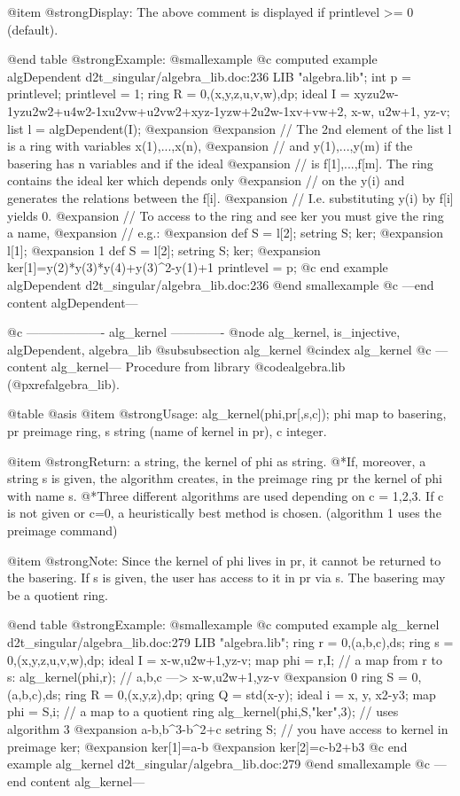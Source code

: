 @item @strong{Display:}
The above comment is displayed if printlevel >= 0 (default).

@end table
@strong{Example:}
@smallexample
@c computed example algDependent d2t_singular/algebra_lib.doc:236 
LIB "algebra.lib";
int p = printlevel; printlevel = 1;
ring R = 0,(x,y,z,u,v,w),dp;
ideal I = xyzu2w-1yzu2w2+u4w2-1xu2vw+u2vw2+xyz-1yzw+2u2w-1xv+vw+2,
x-w, u2w+1, yz-v;
list l = algDependent(I);
@expansion{} 
@expansion{} // The 2nd element of the list l is a ring with variables x(1),...,x(n),
@expansion{} // and y(1),...,y(m) if the basering has n variables and if the ideal
@expansion{} // is f[1],...,f[m]. The ring contains the ideal ker which depends only
@expansion{} // on the y(i) and generates the relations between the f[i].
@expansion{} // I.e. substituting y(i) by f[i] yields 0.
@expansion{} // To access to the ring and see ker you must give the ring a name,
@expansion{} // e.g.:
@expansion{}              def S = l[2]; setring S; ker;
@expansion{} 	
l[1];
@expansion{} 1
def S = l[2]; setring S;
ker;
@expansion{} ker[1]=y(2)*y(3)*y(4)+y(3)^2-y(1)+1
printlevel = p;
@c end example algDependent d2t_singular/algebra_lib.doc:236
@end smallexample
@c ---end content algDependent---

@c ------------------- alg_kernel -------------
@node alg_kernel, is_injective, algDependent, algebra_lib
@subsubsection alg_kernel
@cindex alg_kernel
@c ---content alg_kernel---
Procedure from library @code{algebra.lib} (@pxref{algebra_lib}).

@table @asis
@item @strong{Usage:}
alg_kernel(phi,pr[,s,c]); phi map to basering, pr preimage ring,
s string (name of kernel in pr), c integer.

@item @strong{Return:}
a string, the kernel of phi as string.
@*If, moreover, a string s is given, the algorithm creates, in the
preimage ring pr the kernel of phi with name s.
@*Three different algorithms are used depending on c = 1,2,3.
If c is not given or c=0, a heuristically best method is chosen.
(algorithm 1 uses the preimage command)

@item @strong{Note:}
Since the kernel of phi lives in pr, it cannot be returned to the
basering. If s is given, the user has access to it in pr via s.
The basering may be a quotient ring.

@end table
@strong{Example:}
@smallexample
@c computed example alg_kernel d2t_singular/algebra_lib.doc:279 
LIB "algebra.lib";
ring r = 0,(a,b,c),ds;
ring s = 0,(x,y,z,u,v,w),dp;
ideal I = x-w,u2w+1,yz-v;
map phi = r,I;                // a map from r to s:
alg_kernel(phi,r);            // a,b,c ---> x-w,u2w+1,yz-v
@expansion{} 0
ring S = 0,(a,b,c),ds;
ring R = 0,(x,y,z),dp;
qring Q = std(x-y);
ideal i = x, y, x2-y3;
map phi = S,i;                 // a map to a quotient ring
alg_kernel(phi,S,"ker",3);     // uses algorithm 3
@expansion{} a-b,b^3-b^2+c
setring S;                     // you have access to kernel in preimage
ker;
@expansion{} ker[1]=a-b
@expansion{} ker[2]=c-b2+b3
@c end example alg_kernel d2t_singular/algebra_lib.doc:279
@end smallexample
@c ---end content alg_kernel---

